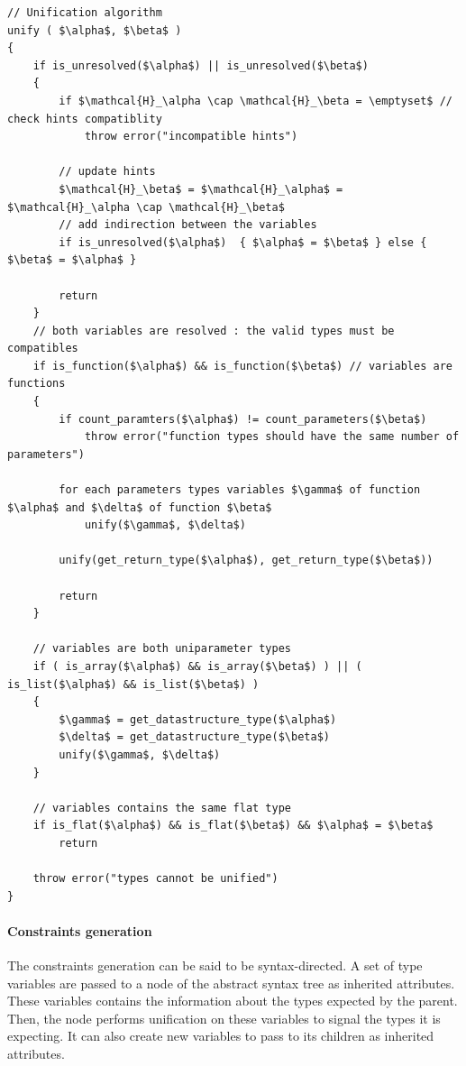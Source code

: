 \documentclass[a4paper,11pt]{article}
\begin{document}
\begin{center}
\begin{minipage}{0.75\linewidth}
\begin{lstlisting}[mathescape,caption={Unification algorithm},label={lst:unification}]
// Unification algorithm
unify ( $\alpha$, $\beta$ )
{
	if is_unresolved($\alpha$) || is_unresolved($\beta$) 
	{
		if $\mathcal{H}_\alpha \cap \mathcal{H}_\beta = \emptyset$ // check hints compatiblity
			throw error("incompatible hints")
	 	
	 	// update hints 
	 	$\mathcal{H}_\beta$ = $\mathcal{H}_\alpha$ = $\mathcal{H}_\alpha \cap \mathcal{H}_\beta$
		// add indirection between the variables
		if is_unresolved($\alpha$)	{ $\alpha$ = $\beta$ } else { $\beta$ = $\alpha$ }
		
		return  
	}	
	// both variables are resolved : the valid types must be compatibles 
	if is_function($\alpha$) && is_function($\beta$) // variables are functions
	{
		if count_paramters($\alpha$) != count_parameters($\beta$) 
			throw error("function types should have the same number of parameters")
		
		for each parameters types variables $\gamma$ of function $\alpha$ and $\delta$ of function $\beta$
			unify($\gamma$, $\delta$)
		
		unify(get_return_type($\alpha$), get_return_type($\beta$))
		
		return
	}

	// variables are both uniparameter types
	if ( is_array($\alpha$) && is_array($\beta$) ) || ( is_list($\alpha$) && is_list($\beta$) ) 
	{
		$\gamma$ = get_datastructure_type($\alpha$)
		$\delta$ = get_datastructure_type($\beta$)
		unify($\gamma$, $\delta$)
	}
	
	// variables contains the same flat type
	if is_flat($\alpha$) && is_flat($\beta$) && $\alpha$ = $\beta$
		return
		
	throw error("types cannot be unified")
}
\end{lstlisting}
\end{minipage}
\end{center}
\paragraph{Constraints generation} The constraints generation can be said to be syntax-directed. A set of type variables are passed to a node of the abstract syntax tree as inherited attributes. These variables contains the information about the types expected by the parent. Then, the node performs unification on these variables to signal the types it is expecting. It can also create new variables to pass to its children as inherited attributes.
\end{document}
